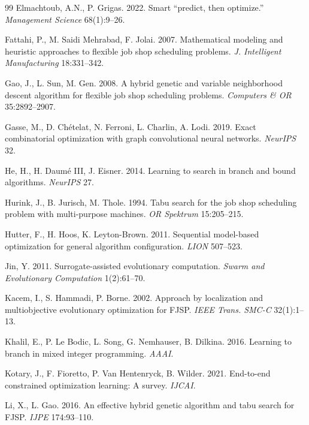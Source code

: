 \documentclass[12pt]{article}
\begin{document}
\begin{thebibliography}{99}
 Elmachtoub, A.N., P. Grigas. 2022. Smart ``predict, then optimize.'' \textit{Management Science} 68(1):9--26.

 Fattahi, P., M. Saidi Mehrabad, F. Jolai. 2007. Mathematical modeling and heuristic approaches to flexible job shop scheduling problems. \textit{J. Intelligent Manufacturing} 18:331--342.

 Gao, J., L. Sun, M. Gen. 2008. A hybrid genetic and variable neighborhood descent algorithm for flexible job shop scheduling problems. \textit{Computers \& OR} 35:2892--2907.

 Gasse, M., D. Ch\'{e}telat, N. Ferroni, L. Charlin, A. Lodi. 2019. Exact combinatorial optimization with graph convolutional neural networks. \textit{NeurIPS} 32.

 He, H., H. Daum\'{e} III, J. Eisner. 2014. Learning to search in branch and bound algorithms. \textit{NeurIPS} 27.

 Hurink, J., B. Jurisch, M. Thole. 1994. Tabu search for the job shop scheduling problem with multi-purpose machines. \textit{OR Spektrum} 15:205--215.

 Hutter, F., H. Hoos, K. Leyton-Brown. 2011. Sequential model-based optimization for general algorithm configuration. \textit{LION} 507--523.

 Jin, Y. 2011. Surrogate-assisted evolutionary computation. \textit{Swarm and Evolutionary Computation} 1(2):61--70.

 Kacem, I., S. Hammadi, P. Borne. 2002. Approach by localization and multiobjective evolutionary optimization for FJSP. \textit{IEEE Trans. SMC-C} 32(1):1--13.

 Khalil, E., P. Le Bodic, L. Song, G. Nemhauser, B. Dilkina. 2016. Learning to branch in mixed integer programming. \textit{AAAI}.

 Kotary, J., F. Fioretto, P. Van Hentenryck, B. Wilder. 2021. End-to-end constrained optimization learning: A survey. \textit{IJCAI}.

 Li, X., L. Gao. 2016. An effective hybrid genetic algorithm and tabu search for FJSP. \textit{IJPE} 174:93--110.


\end{thebibliography}
\end{document}
